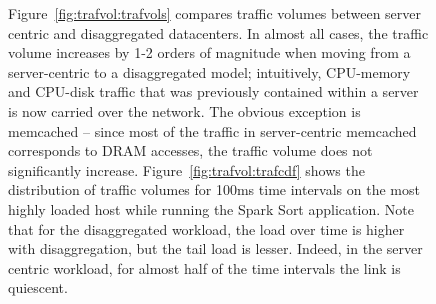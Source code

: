 %
\begin{figure}
    \centering
    \caption{\small{
    Figure~\ref{fig:trafvol:trafvols} compares traffic volumes between server centric and disaggregated datacenters. In almost all cases, the traffic volume increases by 1-2 orders of magnitude when moving from a server-centric to a disaggregated model; intuitively, CPU-memory and CPU-disk traffic that was previously contained within a server is now carried over the network. The obvious exception is memcached -- since most of the traffic in server-centric memcached corresponds to DRAM accesses, the traffic volume does not significantly increase.
    Figure~\ref{fig:trafvol:trafcdf} shows the distribution of traffic volumes for 100ms time intervals on the most highly loaded host while running the Spark Sort application. Note that for the disaggregated workload, the load over time is higher with disaggregation, but the tail load is lesser. Indeed, in the server centric workload, for almost half of the time intervals the link is quiescent.
    }}
    \label{fig:trafvol}
\end{figure}
%
\newpage
